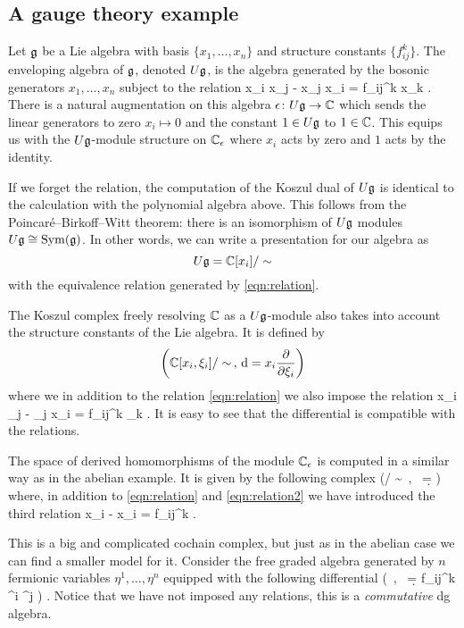 \documentclass[11pt]{amsart}
\begin{document}
\subsection{A gauge theory example}


Let $\mathfrak g$ be a Lie algebra with basis $\{x_1,\ldots, x_n\}$ and structure constants $\{f_{ij}^k\}$. 
The enveloping algebra of $\mathfrak g$, denoted $U \mathfrak g$, is the algebra generated by the bosonic generators $x_1,\ldots,x_n$ subject to the relation 
\beqn \label{eqn:relation}
x_i x_j - x_j x_i = f_{ij}^k x_k .
\eeqn
There is a natural augmentation on this algebra $\epsilon \colon U \mathfrak g \to \mathbb C$ which sends the linear generators to zero $x_i \mapsto 0$ and the constant $1 \in U \mathfrak g$ to $1 \in \mathbb C$. 
This equips us with the $U \mathfrak g$-module structure on $\mathbb C_\epsilon$ where $x_i$ acts by zero and $1$ acts by the identity. 

If we forget the relation, the computation of the Koszul dual of $U \mathfrak g$ is identical to the calculation with the polynomial algebra above. 
This follows from the Poincar\'e--Birkoff--Witt theorem: there is an isomorphism of $U\mathfrak g$ modules $U \mathfrak g \cong \operatorname{Sym} (\mathfrak g)$. 
In other words, we can write a presentation for our algebra as
\[
U \mathfrak g = \mathbb C[x_i] / \sim 
\]
with the equivalence relation generated by \eqref{eqn:relation}. 

The Koszul complex freely resolving $\mathbb C$ as a $U \mathfrak g$-module also takes into account the structure constants of the Lie algebra. 
It is defined by
\[
\left(\mathbb C[x_i,\xi_i] / \sim \, , \,{\rm d} =  x_i \frac{\partial}{\partial \xi_i} \right) 
\]
where we in addition to the relation \eqref{eqn:relation} we also impose the relation
\beqn \label{eqn:relation2}
x_i \xi_j - \xi_j x_i = f_{ij}^k \xi_k .
\eeqn
It is easy to see that the differential is compatible with the relations.

The space of derived homomorphisms of the module $\mathbb C_\epsilon$ is computed in a similar way as in the abelian example. 
It is given by the following complex 
\beqn
\label{eqn:big}
\left(\CC{} / \sim \, , \, \d =  \right) 
\eeqn
where, in addition to \eqref{eqn:relation} and \eqref{eqn:relation2} we have introduced the third relation
\beqn \label{eqn:relation3}
x_i  -  x_i = f_{ij}^k  .
\eeqn

This is a big and complicated cochain complex, but just as in the abelian case we can find a smaller model for it.
Consider the free graded algebra generated by $n$ fermionic variables $\eta^1, \ldots, \eta^n$ equipped with the following differential
\beqn\label{eqn:ce1}
\left(\CC[\eta^i] \, , \, \d =  f_{ij}^k \eta^i \eta^j   \right) .
\eeqn
Notice that we have not imposed any relations, this is a {\em commutative} dg algebra.
\end{document}
